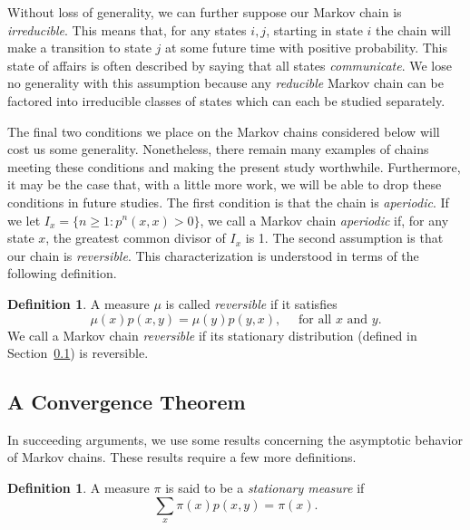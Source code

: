 \documentclass[12pt,letterpaper]{report}
\theoremstyle{plain}
\theoremstyle{definition}
\newtheorem{definition}[theorem]{Definition}
\theoremstyle{remark}
\numberwithin{theorem}{chapter}
\numberwithin{claim}{chapter}
\numberwithin{equation}{chapter}
\numberwithin{conjecture}{chapter}
\newcommand\<{\ensuremath{\langle}}
\renewcommand\>{\ensuremath{\rangle}}
\begin{document}
Without loss of generality, we can further suppose our Markov chain is \emph{irreducible}. This
means that, for any states $i, j$, starting in state $i$ the chain will make a
transition to state $j$ at some future time with positive probability. This
state of affairs is often described by saying that all states \emph{communicate}. We
lose no generality with this assumption because any \emph{reducible} Markov chain can
be factored into irreducible classes of states which can each be studied
separately. 

The final two conditions we place on the Markov chains considered below will cost us
some generality. Nonetheless, there remain many examples of chains meeting these conditions
and making the present study worthwhile. Furthermore, it may be the case that, with a little
more work, we will be able to drop these conditions in future studies. The first condition is that
the chain is \emph{aperiodic}. If we let $I_x = \{n \geq 1: p^n(x,x) > 0\}$, we
call a Markov chain \emph{aperiodic} if, for any state $x$, the greatest common
divisor of $I_x$ is 1. The second assumption is that our chain is 
\emph{reversible}. This characterization is understood in terms of the following definition.

\begin{definition}
\label{def:2.1.3}
A measure $\mu$ is called \emph{reversible} if it satisfies
\[
\mu(x)p(x,y) = \mu(y)p(y,x), \quad  \text{ for all $x$ and $y$.}
\]
We call a Markov chain \emph{reversible} if its stationary distribution (defined
in Section~\ref{sec:convergence-theorem}) is reversible. 
\end{definition}




\subsection{A Convergence Theorem}
\label{sec:convergence-theorem}
In succeeding arguments, we use some results concerning the asymptotic behavior of
Markov chains. These results require a few more definitions.

\begin{definition}
\label{def:2.1.4}
A measure $\pi$ is said to be a \emph{stationary measure} if
\begin{equation}
  \label{eq:2.4}
\sum_x \pi(x) p(x,y) = \pi(x).
\end{equation}
\end{definition}
\end{document}
